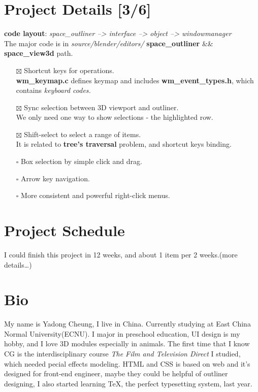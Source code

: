 \documentclass[11pt]{article}
\begin{document}
\section*{Project Details [3/6]}
\label{sec:org5ae2747}
 \textbf{code layout}: \emph{space\_outliner --> interface --> object --> windowmanager} \\
 The major code is in \emph{source/blender/editors/} \textbf{space\_outliner} \&\& \textbf{space\_view3d}
path.\\
\begin{itemize}
\item[{$\boxtimes$}] Shortcut keys for operations.\\
\textbf{wm\_keymap.c} defines keymap and includes \textbf{wm\_event\_types.h}, which contains \emph{keyboard codes.}
\item[{$\boxtimes$}] Sync selection between 3D viewport and outliner.\\
We only need one way to show selections - the highlighted row.
\item[{$\boxtimes$}] Shift-select to select a range of items.\\
It is related to \textbf{tree's traversal} problem, and shortcut keys binding.
\item[{$\square$}] Box selection by simple click and drag.\\
\item[{$\square$}] Arrow key navigation.
\item[{$\square$}] More consistent and powerful right-click menus.
\end{itemize}
\section*{Project Schedule}
\label{sec:orgc8efe29}
I could finish this project in 12 weeks, and about 1 item per 2 weeks.(more details\ldots{})

\section*{Bio}
\label{sec:orga40ab8d}
  My name is Yadong Cheung, I live in China.
Currently studying at East China Normal University(ECNU).
I major in preschool education, UI design is my hobby, and I love 3D modules especially in animals.
The first time that I know CG is the interdisciplinary course \emph{The Film and Television Direct} 
I studied, which needed pecial effects modeling. HTML and CSS is based on web and it's designed for
front-end engineer, maybe they could be helpful of outliner designing, I also started learning \TeX, the perfect
typesetting system, last year. 
\end{document}
